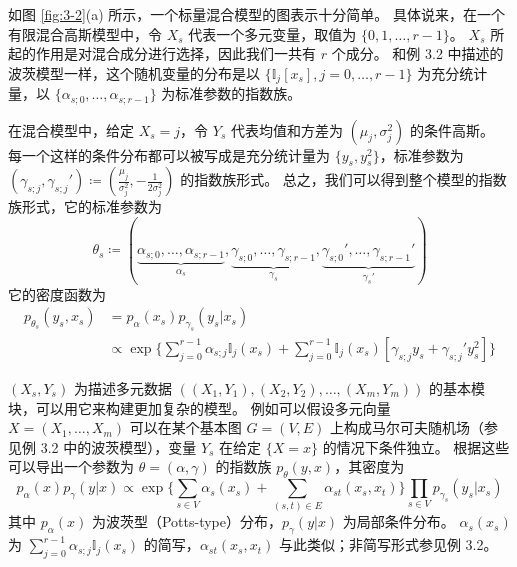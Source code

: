 \begin{tcolorbox}
\begin{exam}[混合模型]

如图 \ref{fig:3-2}(a) 所示，一个标量混合模型的图表示十分简单。
具体说来，在一个有限混合高斯模型中，令 $X_s$ 代表一个多元变量，取值为 $\{0, 1, \dots, r-1\}$。
$X_s$ 所起的作用是对混合成分进行选择，因此我们一共有 $r$ 个成分。
和例 3.2 中描述的波茨模型一样，这个随机变量的分布是以 $\{\mathbb{I}_j[x_s], j = 0, \dots, r-1\}$ 为充分统计量，以 $\{\alpha_{s;0}, \dots, \alpha_{s;r-1}\}$ 为标准参数的指数族。

在混合模型中，给定 $X_s = j$，令 $Y_s$ 代表均值和方差为 $(\mu_j, \sigma_j^2)$ 的条件高斯。
每一个这样的条件分布都可以被写成是充分统计量为 $\{y_s, y_s^2\}$，标准参数为 $(\gamma_{s;j}, \gamma_{s;j}') \coloneqq (\frac{\mu_j}{\sigma_j^2}, -\frac{1}{2\sigma_j^2})$ 的指数族形式。
总之，我们可以得到整个模型的指数族形式，它的标准参数为
$$\theta_s \coloneqq (\underbrace{\alpha_{s;0}, \dots, \alpha_{s;r-1}}_{\alpha_s}, \underbrace{\gamma_{s;0}, \dots, \gamma_{s;r-1}}_{\gamma_s}, \underbrace{\gamma_{s;0}', \dots, \gamma_{s;r-1}'}_{\gamma_s'})$$
它的密度函数为
\begin{align}
    p_{\theta_s}(y_s, x_s) &= p_{\alpha}(x_s)p_{\gamma_s}(y_s|x_s)  \nonumber \\
    &\propto \exp{\{\sum_{j = 0}^{r-1}\alpha_{s;j}\mathbb{I}_j(x_s) + \sum_{j = 0}^{r-1}\mathbb{I}_j(x_s)[\gamma_{s;j}y_s + \gamma_{s;j}'y_s^2]\}}
\end{align}

$(X_s, Y_s)$ 为描述多元数据 $((X_1, Y_1), (X_2, Y_2), \dots, (X_m, Y_m))$ 的基本模块，可以用它来构建更加复杂的模型。
例如可以假设多元向量 $X = (X_1, \dots, X_m)$ 可以在某个基本图 $G = (V, E)$ 上构成马尔可夫随机场（参见例 3.2 中的波茨模型），变量 $Y_s$ 在给定 $\{X = x\}$ 的情况下条件独立。
根据这些可以导出一个参数为 $\theta = (\alpha, \gamma)$ 的指数族 $p_{\theta}(y, x)$，其密度为
\begin{equation}
    p_{\alpha}(x)p_{\gamma}(y|x) \propto \exp{\{\sum_{s \in V}\alpha_s(x_s) + \sum_{(s, t) \in E}\alpha_{st}(x_s, x_t)\}\prod_{s \in V}p_{\gamma_s}(y_s|x_s)}
\end{equation}
其中 $p_{\alpha}(x)$ 为波茨型（Potts-type）分布，$p_{\gamma}(y|x)$ 为局部条件分布。
$\alpha_s(x_s)$ 为 $\sum_{j = 0}^{r-1}\alpha_{s;j}\mathbb{I}_j(x_s)$ 的简写，$\alpha_{st}(x_s, x_t)$ 与此类似；非简写形式参见例 3.2。

\end{exam}
\end{tcolorbox}

